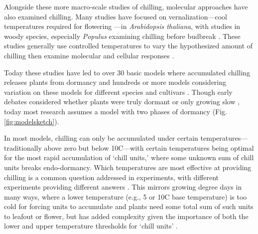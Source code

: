 \documentclass[11pt]{article}
\begin{document}
Alongside these more macro-scale studies of chilling, molecular approaches have also examined chilling. Many studies have focused on vernalization---cool temperatures required for flowering \citep{kim2009vernalization}---in \emph{Arabidopsis thaliana}, with studies in woody species, especially \emph{Populus} examining chilling before budbreak \citep[][]{azeez2021early,cai2024molecular}. These studies generally use controlled temperatures to vary the hypothesized amount of chilling then examine molecular and cellular responses \citep[e.g.,][]{pan2021aba,azeez2021early,cai2024molecular}.

Today these studies have led to over 30 basic models where accumulated chilling releases plants from dormancy and hundreds or more models considering variation on these models for different species and cultivars \citep[][]{basler2016evaluating,hufkens2018integrated}. Though early debates considered whether plants were truly dormant or only growing slow \citep[`dormancy' or `rest' versus `quiescent';][]{considine2016language}, today most research assumes a model with two phases of dormancy (Fig. \ref{fig:modelsketch}). 

In most models, chilling can only be accumulated under certain temperatures---traditionally above zero but below 10\degree C---with certain temperatures 
being optimal for the most rapid accumulation of `chill units,' where some unknown sum of chill units breaks endo-dormancy. Which temperatures are most effective at providing chilling is a common question addressed in experiments, with different experiments providing different answers \citep{vitasselev,baum2021}. This mirrors growing degree days in many ways, where a lower temperature (e.g., 5 or 10\degree C base temperature) is too cold for forcing units to accumulate and plants need some total sum of such units to leafout or flower, but has added complexity given the importance of both the lower and upper temperature thresholds for `chill units' \citep[whereas growing degree day models can often ignore the upper threshold, estimated at 25\degree C or above, as it is rarely reached in natural spring conditions][]{mcmaster1997growing,li2021comparisons}. %
\end{document}

